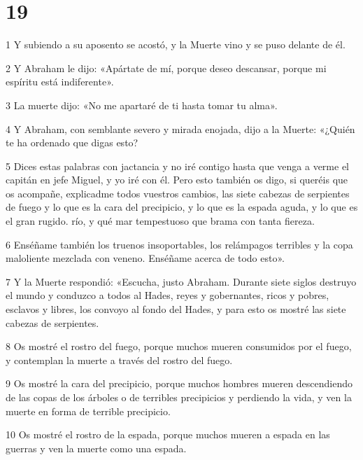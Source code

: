 \chapter{19}

\par 1 Y subiendo a su aposento se acostó, y la Muerte vino y se puso delante de él.

\par 2 Y Abraham le dijo: «Apártate de mí, porque deseo descansar, porque mi espíritu está indiferente».

\par 3 La muerte dijo: «No me apartaré de ti hasta tomar tu alma».

\par 4 Y Abraham, con semblante severo y mirada enojada, dijo a la Muerte: «¿Quién te ha ordenado que digas esto?

\par 5 Dices estas palabras con jactancia y no iré contigo hasta que venga a verme el capitán en jefe Miguel, y yo iré con él. Pero esto también os digo, si queréis que os acompañe, explicadme todos vuestros cambios, las siete cabezas de serpientes de fuego y lo que es la cara del precipicio, y lo que es la espada aguda, y lo que es el gran rugido. río, y qué mar tempestuoso que brama con tanta fiereza.

\par 6 Enséñame también los truenos insoportables, los relámpagos terribles y la copa maloliente mezclada con veneno. Enséñame acerca de todo esto».

\par 7 Y la Muerte respondió: «Escucha, justo Abraham. Durante siete siglos destruyo el mundo y conduzco a todos al Hades, reyes y gobernantes, ricos y pobres, esclavos y libres, los convoyo al fondo del Hades, y para esto os mostré las siete cabezas de serpientes.

\par 8 Os mostré el rostro del fuego, porque muchos mueren consumidos por el fuego, y contemplan la muerte a través del rostro del fuego.

\par 9 Os mostré la cara del precipicio, porque muchos hombres mueren descendiendo de las copas de los árboles o de terribles precipicios y perdiendo la vida, y ven la muerte en forma de terrible precipicio.

\par 10 Os mostré el rostro de la espada, porque muchos mueren a espada en las guerras y ven la muerte como una espada.

